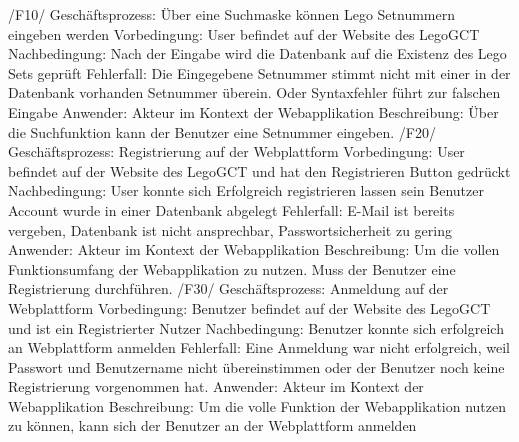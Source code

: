 /F10/ \newline
Geschäftsprozess: Über eine Suchmaske können Lego Setnummern eingeben werden\newline
Vorbedingung: User befindet auf der Website des LegoGCT\newline
Nachbedingung: Nach der Eingabe wird die Datenbank auf die Existenz des Lego Sets geprüft\newline
Fehlerfall: Die Eingegebene Setnummer stimmt nicht mit einer in der Datenbank vorhanden Setnummer überein. Oder Syntaxfehler führt zur falschen Eingabe\newline
Anwender: Akteur im Kontext der Webapplikation\newline
Beschreibung: Über die Suchfunktion kann der Benutzer eine Setnummer eingeben.\newline\newline
/F20/\newline
Geschäftsprozess: Registrierung auf der Webplattform\newline
Vorbedingung: User befindet auf der Website des LegoGCT und hat den Registrieren Button gedrückt\newline
Nachbedingung: User konnte sich Erfolgreich registrieren lassen sein Benutzer Account wurde in einer Datenbank abgelegt\newline
Fehlerfall: E-Mail ist bereits vergeben, Datenbank ist nicht ansprechbar, Passwortsicherheit zu gering\newline
Anwender: Akteur im Kontext der Webapplikation\newline
Beschreibung: Um die vollen Funktionsumfang der Webapplikation zu nutzen. Muss der Benutzer eine Registrierung durchführen.\newline\newline
/F30/\newline
Geschäftsprozess: Anmeldung auf der Webplattform\newline
Vorbedingung: Benutzer befindet auf der Website des LegoGCT und ist ein Registrierter Nutzer\newline
Nachbedingung: Benutzer konnte sich erfolgreich an Webplattform anmelden\newline
Fehlerfall: Eine Anmeldung war nicht erfolgreich, weil Passwort und Benutzername nicht übereinstimmen oder der Benutzer noch keine Registrierung vorgenommen hat.\newline
Anwender: Akteur im Kontext der Webapplikation\newline
Beschreibung: Um die volle Funktion der Webapplikation nutzen zu können, kann sich der Benutzer an der Webplattform anmelden\newline\newline
